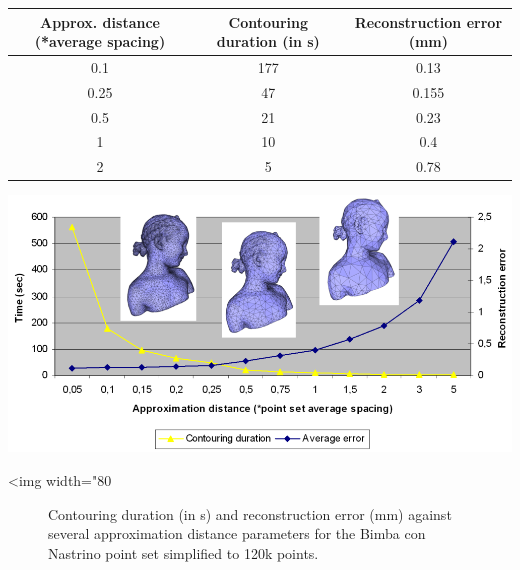 \begin{tabular}{|c|c|c|}
  \hline
  Approx. distance (*average spacing)    & Contouring duration (in s) & Reconstruction error (mm) \\
  \hline
  0.1                                    & 177                       & 0.13 \\
  0.25                                   & 47                        & 0.155 \\
  0.5                                    & 21                        & 0.23 \\
  1                                      & 10                        & 0.4 \\
  2                                      & 5                         & 0.78 \\
  \hline
\end{tabular}

\begin{center}
    \begin{ccTexOnly}
      \includegraphics[width=1.0\textwidth]{Surface_reconstruction_points_3/contouring_bench}
    \end{ccTexOnly}
    \begin{ccHtmlOnly}
        <img width="80%
    \end{ccHtmlOnly}
    \begin{figure}[h]
        \caption{Contouring duration (in s) and reconstruction error (mm)
                 against several approximation distance parameters
                 for the Bimba con Nastrino point set simplified to 120k points.}
        \label{Surface_reconstruction_points_3-fig-contouring_bench}
    \end{figure}
\end{center}



